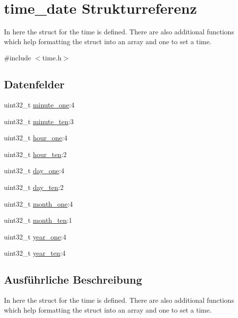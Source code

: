 \hypertarget{structtime__date}{}\section{time\+\_\+date Strukturreferenz}
\label{structtime__date}


In here the struct for the time is defined. There are also additional functions which help formatting the struct into an array and one to set a time.  




{\ttfamily \#include $<$time.\+h$>$}

\subsection*{Datenfelder}
\begin{DoxyCompactItemize}
\item 
uint32\+\_\+t \hyperlink{structtime__date_aeb047e7931fb6cd6e4c751d8143c16a4}{minute\+\_\+one}\+:4
\item 
uint32\+\_\+t \hyperlink{structtime__date_a2659c12e8307db4c98ce9cb1bf53bc0e}{minute\+\_\+ten}\+:3
\item 
uint32\+\_\+t \hyperlink{structtime__date_a338fe5a5db873c63189f9c98bf0376fc}{hour\+\_\+one}\+:4
\item 
uint32\+\_\+t \hyperlink{structtime__date_a7315167bc0969310bcaedee5699243e5}{hour\+\_\+ten}\+:2
\item 
uint32\+\_\+t \hyperlink{structtime__date_aa49ac5f823611c03f3c3723f12047cfc}{day\+\_\+one}\+:4
\item 
uint32\+\_\+t \hyperlink{structtime__date_af252ce7a893acb93c32d07d0330f900d}{day\+\_\+ten}\+:2
\item 
uint32\+\_\+t \hyperlink{structtime__date_a6ad3129035cd14cf22da6e4a1fecf018}{month\+\_\+one}\+:4
\item 
uint32\+\_\+t \hyperlink{structtime__date_afadd8a2137e5a4d272d63e02386c2bd8}{month\+\_\+ten}\+:1
\item 
uint32\+\_\+t \hyperlink{structtime__date_a55217c761921c4b4443fb1d4dee3f564}{year\+\_\+one}\+:4
\item 
uint32\+\_\+t \hyperlink{structtime__date_a124f7250b4c2e15669a832132940840d}{year\+\_\+ten}\+:4
\end{DoxyCompactItemize}


\subsection{Ausführliche Beschreibung}
In here the struct for the time is defined. There are also additional functions which help formatting the struct into an array and one to set a time. 

